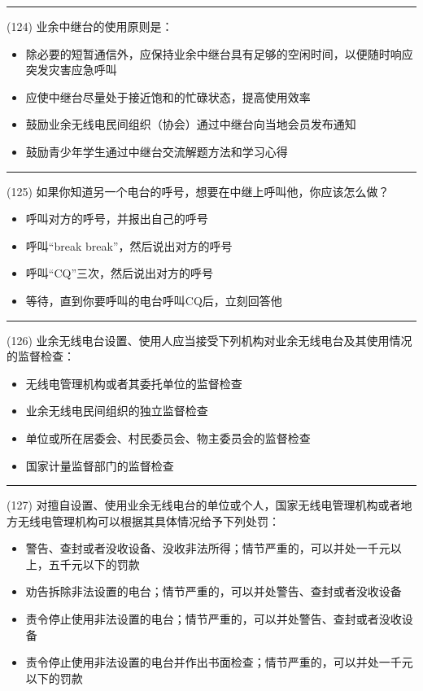 \documentclass[twocolumn]{ctexart}  %
\begin{document}
\noindent\rule{0.5\textwidth}{1pt}
\heiti (124) 业余中继台的使用原则是： \songti {\color{gray} [LK0275] }
\begin{itemize}
	\item  除必要的短暂通信外，应保持业余中继台具有足够的空闲时间，以便随时响应突发灾害应急呼叫
	\item  应使中继台尽量处于接近饱和的忙碌状态，提高使用效率
	\item  鼓励业余无线电民间组织（协会）通过中继台向当地会员发布通知
	\item  鼓励青少年学生通过中继台交流解题方法和学习心得
\end{itemize}


\noindent\rule{0.5\textwidth}{1pt}
\heiti (125) 如果你知道另一个电台的呼号，想要在中继上呼叫他，你应该怎么做？ \songti {\color{gray} [LK1096] }
\begin{itemize}
	\item  呼叫对方的呼号，并报出自己的呼号
	\item  呼叫“break break”，然后说出对方的呼号
	\item  呼叫“CQ”三次，然后说出对方的呼号
	\item  等待，直到你要呼叫的电台呼叫CQ后，立刻回答他
\end{itemize}


\noindent\rule{0.5\textwidth}{1pt}
\heiti (126) 业余无线电台设置、使用人应当接受下列机构对业余无线电台及其使用情况的监督检查： \songti {\color{gray} [LK0074] }
\begin{itemize}
	\item  无线电管理机构或者其委托单位的监督检查
	\item  业余无线电民间组织的独立监督检查
	\item  单位或所在居委会、村民委员会、物主委员会的监督检查
	\item  国家计量监督部门的监督检查
\end{itemize}


\noindent\rule{0.5\textwidth}{1pt}
\heiti (127) 对擅自设置、使用业余无线电台的单位或个人，国家无线电管理机构或者地方无线电管理机构可以根据其具体情况给予下列处罚： \songti {\color{gray} [LK0094] }
\begin{itemize}
	\item  警告、查封或者没收设备、没收非法所得；情节严重的，可以并处一千元以上，五千元以下的罚款
	\item  劝告拆除非法设置的电台；情节严重的，可以并处警告、查封或者没收设备
	\item  责令停止使用非法设置的电台；情节严重的，可以并处警告、查封或者没收设备
	\item  责令停止使用非法设置的电台并作出书面检查；情节严重的，可以并处一千元以下的罚款
\end{itemize}
\end{document}
